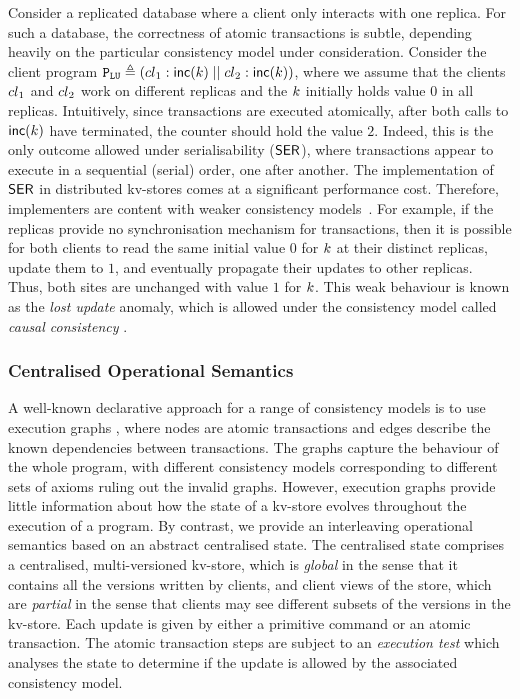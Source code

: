 Consider a replicated database where
a client only interacts with one replica.
For such a database, the 
correctness of atomic transactions is subtle, depending heavily on the
particular consistency model under consideration.  
Consider the client program
$\mathtt{P}_{\mathtt{LU}} \triangleq \left({cl}_1 : \mathsf{inc}(k) \;|| \; {cl}_2:
  \mathsf{inc}(k) \right)$, 
where we assume that the clients \( {cl}_1 \) and \( {cl}_2 \) work on different replicas and
the \(k\) initially holds value \(0\) in all replicas.
Intuitively, since transactions are executed atomically, after both
calls to \(\mathsf{inc}(k)\) have terminated, the counter should hold 
the value \(2\).
Indeed, this is the only outcome allowed under serialisability (\(\mathsf{SER}\)), where transactions
appear to execute in a sequential (serial) order, one after another.
The implementation of \(\mathsf{SER}\) in distributed kv-stores comes at a
significant performance cost. Therefore, implementers are content with
{weaker} consistency models~\cite{tango,CORFU,ramp,rola,cops,wren,redblue,PSI,NMSI,gdur,clocksi,distrsi}. 
For example, if the replicas provide no synchronisation mechanism for transactions,
then it is possible for both clients to read the same initial value \(0\) for \(k\) at their
distinct replicas, update them to \(1\), and eventually propagate their updates to other replicas. 
Thus, both
sites  are unchanged with value  \(1\) for \(k\).
This weak behaviour is known as the \emph{lost update} anomaly, which
is  allowed under the consistency model called {\em causal consistency} \cite{cops,wren,redblue}.



\subsubsection{Centralised Operational Semantics}
A well-known declarative approach for a range of consistency models
is to use execution graphs \cite{adya-icde,adya,framework-concur,ev_transactions},
where nodes are atomic transactions and edges describe the
known dependencies between transactions. The graphs capture the
behaviour of the whole program, with different consistency models
corresponding to different sets of axioms ruling out the invalid graphs. 
However, execution graphs provide little information about how the 
state of a kv-store evolves throughout the execution of a program.
By contrast, we provide an interleaving operational semantics based on an
abstract centralised state. The centralised state comprises a
centralised, multi-versioned kv-store, which is {\em global} in the
sense that it contains all the versions written by clients, and client views of the store,
which are {\em partial} in the sense that clients may see different 
subsets of the versions in the kv-store. Each update is given by either
a primitive command or an atomic transaction. The atomic
transaction steps are subject to an {\em execution test} which
analyses the state to determine if the update is allowed by 
the associated  consistency model. 




